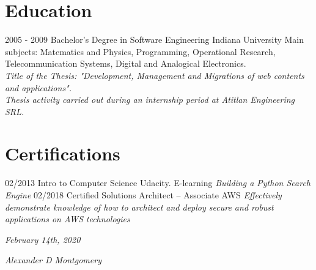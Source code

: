 \documentclass[]{friggeri-cv}
\begin{document}
\section{Education}
\begin{entrylist}
  \entry
    {2005 - 2009}
    {Bachelor's Degree in Software Engineering}
    {Indiana University}
    {Main subjects: Matematics and Physics, Programming, Operational Research, Telecommunication Systems, Digital and Analogical Electronics.\\
    \emph{Title of the Thesis: "Development, Management and Migrations of web contents and applications".}\\
    \emph{Thesis activity carried out during an internship period at Atitlan Engineering SRL.}\\}
\end{entrylist}

\section{Certifications}
\begin{entrylist}
  \entry
    {02/2013}
    {Intro to Computer Science}
    {Udacity. E-learning}
    {\emph{Building a Python Search Engine}}
     \entry
    {02/2018}
    {Certified Solutions Architect – Associate }
    {AWS}
    {\emph{Effectively demonstrate knowledge of how to architect and deploy secure and robust applications on AWS technologies}}
\end{entrylist}
\begin{flushleft}
\emph{February 14th, 2020}
\end{flushleft}
\begin{flushright}
\emph{Alexander D Montgomery}
\end{flushright}
\end{document}

